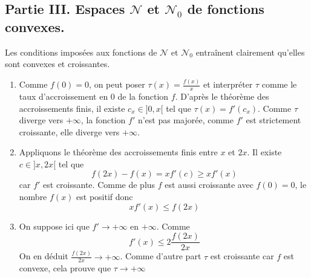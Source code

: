\subsection*{Partie III. Espaces $\mathcal{N}$ et $\mathcal{N}_0$ de fonctions convexes.}
Les conditions imposées aux fonctions de $\mathcal{N}$ et $\mathcal{N}_0$ entraînent clairement qu'elles sont convexes et croissantes.
\begin{enumerate}
\item Comme $f(0)=0$, on peut poser $\tau(x)=\frac{f(x)}{x}$ et interpréter $\tau$ comme le taux d'accroissement en 0 de la fonction $f$. D'après le théorème des accroissements finis, il existe $c_x \in ]0,x[$ tel que $\tau(x)=f'(c_x)$. Comme $\tau$ diverge vers $+\infty$, la fonction $f'$ n'est pas majorée, comme $f'$ est strictement croissante, elle diverge vers $+\infty$.
\item Appliquons le théorème des accroissements finis entre $x$ et $2x$.\newline
Il existe $c\in]x,2x[$ tel que
\[f(2x)-f(x)=xf'(c)\geq xf'(x)\]
car $f'$ est croissante. Comme de plus $f$ est aussi croissante avec $f(0)=0$, le nombre $f(x)$ est positif donc
\[xf'(x)\leq f(2x)\]
\item On suppose ici que $f'\rightarrow +\infty$ en $+\infty$. Comme
\[f'(x)\leq 2 \frac{f(2x)}{2x}\]
On en déduit $\frac{f(2x)}{2x}\rightarrow +\infty$. Comme d'autre part $\tau$ est croissante car $f$ est convexe, cela prouve que $\tau \rightarrow +\infty$
\end{enumerate}

